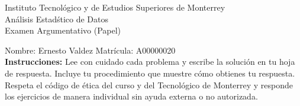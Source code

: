 \documentclass[10pt]{report}
\begin{document}
\newpage



\begin{center}
{\large Instituto Tecnol\'{o}gico y de Estudios Superiores de Monterrey \\
An\'alisis Estad\'stico de Datos } \\
Examen Argumentativo (Papel)
\end{center}

Nombre: \underline{\hspace*{.2in}}
Ernesto Valdez
\underline{\hspace*{.2in}} \quad Matr\'icula:\underline{\hspace*{.2in}}
A00000020
\underline{\hspace*{.2in}} \\

{\bf Instrucciones:} Lee con cuidado cada problema y escribe la soluci\'on
en tu hoja de respuesta. Incluye tu procedimiento que muestre c\'omo obtienes tu respuesta.  Respeta el c\'odigo de \'etica del curso y del Tecnol\'ogico de Monterrey y responde los ejercicios de manera individual sin ayuda externa o no autorizada.
\end{document}
